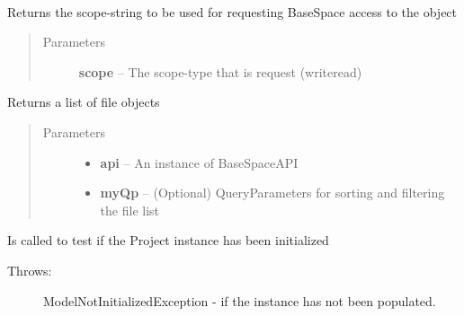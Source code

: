 \documentclass[letterpaper,10pt,english]{sphinxmanual}
\begin{document}
\begin{fulllineitems}
\label{Available modules:BaseSpacePy.model.Analysis.Analysis}~

\begin{fulllineitems}
\label{Available modules:BaseSpacePy.model.Analysis.Analysis.getAccessStr}
Returns the scope-string to be used for requesting BaseSpace access to the object
\begin{quote}\begin{description}
\item[{Parameters}] \leavevmode
\textbf{scope} -- The scope-type that is request (write\textbar{}read)

\end{description}\end{quote}

\end{fulllineitems}


\begin{fulllineitems}
\label{Available modules:BaseSpacePy.model.Analysis.Analysis.getFiles}
Returns a list of file objects
\begin{quote}\begin{description}
\item[{Parameters}] \leavevmode\begin{itemize}
\item {} 
\textbf{api} -- An instance of BaseSpaceAPI

\item {} 
\textbf{myQp} -- (Optional) QueryParameters for sorting and filtering the file list

\end{itemize}

\end{description}\end{quote}

\end{fulllineitems}


\begin{fulllineitems}
\label{Available modules:BaseSpacePy.model.Analysis.Analysis.isInit}
Is called to test if the Project instance has been initialized
\begin{description}
\item[{Throws:}] \leavevmode
ModelNotInitializedException  - if the instance has not been populated.


\end{description}
\end{fulllineitems}
\end{fulllineitems}
\end{document}
